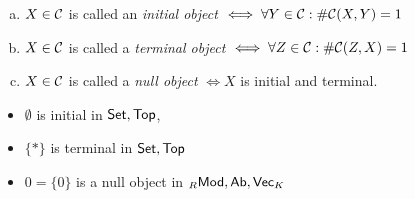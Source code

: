 \documentclass[a4paper]{report}
\begin{document}
\begin{defi}
  \begin{enumerate}[(a)]
\item $X \in \mathcal{C}$ is called an \emph{initial object} $\iff \forall Y \in \mathcal{C} : \#\mathcal{C}(X, Y) = 1$
\item $X \in \mathcal{C}$ is called a \emph{terminal object} $\iff \forall Z \in \mathcal{C} : \#\mathcal{C}(Z, X) = 1$
\item $X \in \mathcal{C}$ is called a \emph{null object} $\iff X$ is initial and terminal.
  \end{enumerate}
\end{defi}
\begin{exmp*}
\begin{itemize}
  \item $\emptyset$ is initial in $\mathsf{Set}, \mathsf{Top}$,
  \item $\{*\}$ is terminal in $\mathsf{Set}, \mathsf{Top}$
        \item $0 = \{0\}$ is a null object in $_{R}\mathsf{Mod}, \mathsf{Ab}, \mathsf{Vec}_{K}$
\end{itemize}
\end{exmp*}
\end{document}
